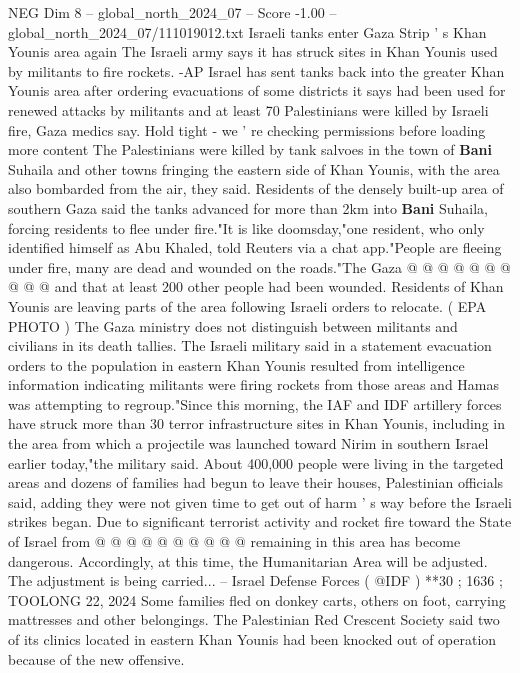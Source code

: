 \begin{textsample}{NEG Dim 8 – global\_north\_2024\_07 – Score -1.00 – global\_north\_2024\_07/111019012.txt}  \label{ex:f8_neg_414}
Israeli tanks enter Gaza Strip ' s Khan Younis area again The Israeli army says it has struck sites in Khan Younis used by militants to fire rockets. -AP Israel has sent tanks back into the greater Khan Younis area after ordering evacuations of some districts it says had been used for renewed attacks by militants and at least 70 Palestinians were killed by Israeli fire, Gaza medics say.
Hold tight - we ' re checking permissions before loading more content The Palestinians were killed by tank salvoes in the town of \textbf{Bani} Suhaila and other towns fringing the eastern side of Khan Younis, with the area also bombarded from the air, they said.
Residents of the densely built-up area of southern Gaza said the tanks advanced for more than 2km into \textbf{Bani} Suhaila, forcing residents to flee under fire."It is like doomsday,"one resident, who only identified himself as Abu Khaled, told Reuters via a chat app."People are fleeing under fire, many are dead and wounded on the roads."The Gaza @ @ @ @ @ @ @ @ @ @ and that at least 200 other people had been wounded.
Residents of Khan Younis are leaving parts of the area following Israeli orders to relocate. ( EPA PHOTO ) The Gaza ministry does not distinguish between militants and civilians in its death tallies.
The Israeli military said in a statement evacuation orders to the population in eastern Khan Younis resulted from intelligence information indicating militants were firing rockets from those areas and Hamas was attempting to regroup."Since this morning, the IAF and IDF artillery forces have struck more than 30 terror infrastructure sites in Khan Younis, including in the area from which a projectile was launched toward Nirim in southern Israel earlier today,"the military said.
About 400,000 people were living in the targeted areas and dozens of families had begun to leave their houses, Palestinian officials said, adding they were not given time to get out of harm ' s way before the Israeli strikes began.
Due to significant terrorist activity and rocket fire toward the State of Israel from @ @ @ @ @ @ @ @ @ @ remaining in this area has become dangerous.
Accordingly, at this time, the Humanitarian Area will be adjusted.
The adjustment is being carried... -- Israel Defense Forces ( @IDF ) **30 ; 1636 ; TOOLONG 22, 2024 Some families fled on donkey carts, others on foot, carrying mattresses and other belongings.
The Palestinian Red Crescent Society said two of its clinics located in eastern Khan Younis had been knocked out of operation because of the new offensive.

\end{textsample}
